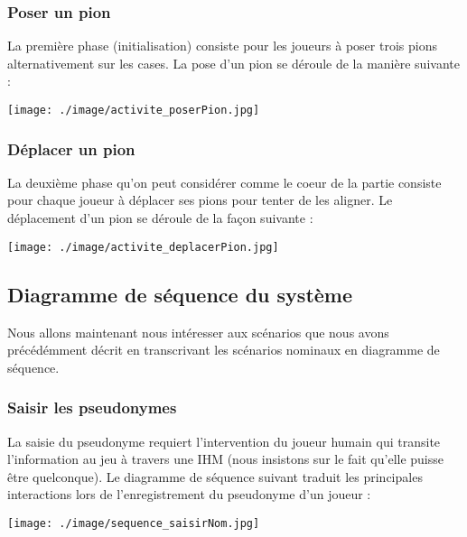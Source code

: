 \documentclass[12pt , a4paper]{article}
\begin{document}
\subsubsection{Poser un pion}
\noindent La première phase (initialisation) consiste pour les joueurs à poser trois pions alternativement sur les cases. La pose d'un pion se déroule de la manière suivante :
	\begin{center}
	  \texttt{[image: ./image/activite\_poserPion.jpg]}
	\end{center}

\subsubsection{Déplacer un pion}
\noindent La deuxième phase qu'on peut considérer comme le coeur de la partie consiste pour chaque joueur à déplacer ses pions pour tenter de les aligner. Le déplacement d'un pion se déroule de la façon suivante :
	\begin{center}
	  \texttt{[image: ./image/activite\_deplacerPion.jpg]}
	\end{center}
	
\subsection{Diagramme de séquence du système}
\noindent Nous allons maintenant nous intéresser aux scénarios que nous avons précédémment décrit en transcrivant les scénarios nominaux en diagramme de séquence.

\begin{landscape}
\subsubsection{Saisir les pseudonymes}
\noindent La saisie du pseudonyme requiert l'intervention du joueur humain qui transite l'information au jeu à travers une IHM (nous insistons sur le fait qu'elle puisse \^etre quelconque). Le diagramme de séquence suivant traduit les principales interactions lors de l'enregistrement du pseudonyme d'un joueur :
	\begin{center}
	  \texttt{[image: ./image/sequence\_saisirNom.jpg]}
	\end{center}
\end{landscape}
\end{document}
